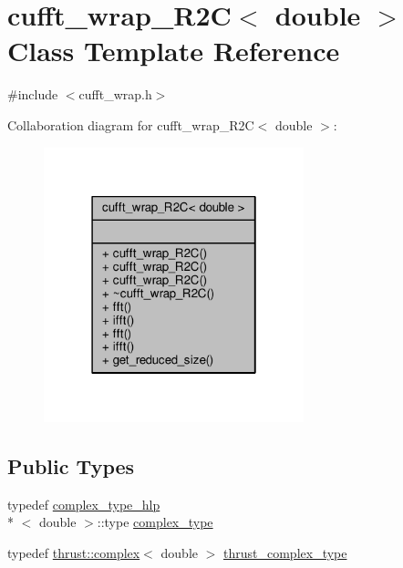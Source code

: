 \hypertarget{classcufft__wrap__R2C_3_01double_01_4}{\section{cufft\-\_\-wrap\-\_\-\-R2\-C$<$ double $>$ Class Template Reference}
\label{classcufft__wrap__R2C_3_01double_01_4}
}


{\ttfamily \#include $<$cufft\-\_\-wrap.\-h$>$}



Collaboration diagram for cufft\-\_\-wrap\-\_\-\-R2\-C$<$ double $>$\-:
\nopagebreak
\begin{figure}[H]
\begin{center}
\leavevmode
\includegraphics[width=214pt]{classcufft__wrap__R2C_3_01double_01_4__coll__graph}
\end{center}
\end{figure}
\subsection*{Public Types}
\begin{DoxyCompactItemize}
\item 
typedef \hyperlink{structcomplex__type__hlp}{complex\-\_\-type\-\_\-hlp}\\*
$<$ double $>$\-::type \hyperlink{classcufft__wrap__R2C_3_01double_01_4_ac8d996c3659f68d38626422f74945e06}{complex\-\_\-type}
\item 
typedef \hyperlink{test__deflation__typedefs_8h_a25cabcac5deb559feab415e2c445d8ba}{thrust\-::complex}$<$ double $>$ \hyperlink{classcufft__wrap__R2C_3_01double_01_4_abc41290148d975b62afbb5988527dc43}{thrust\-\_\-complex\-\_\-type}
\end{DoxyCompactItemize}
